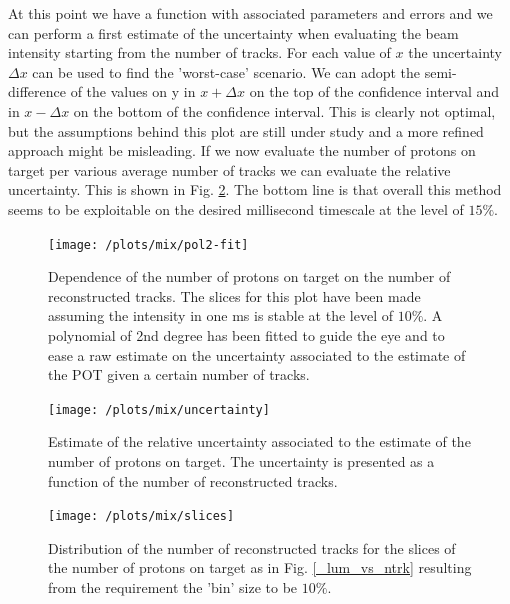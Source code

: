 \documentclass[12pt,a4paper,openright, oneside, titlepage]{book} %
\begin{document}
\noindent At this point we have a function with associated parameters and errors and we can perform a first estimate of the uncertainty when evaluating the beam intensity starting from the number of tracks.
For each value of $x$ the uncertainty $\Delta x$ can be used to find the 'worst-case' scenario.
We can adopt the semi-difference of the values on y in $x+\Delta x$ on the top of the confidence interval and in $x-\Delta x$ on the bottom of the confidence interval.
This is clearly not optimal, 
but the assumptions behind this plot are still under study and a more refined approach might be misleading. 
If we now evaluate the number of protons on target per various average number of tracks we can evaluate the relative uncertainty. 
This is shown in Fig. \ref{_uncertainty}.
The bottom line is that overall this method seems to be exploitable 
on the desired millisecond timescale at the level of $15\%$.\\


\begin{figure}[!htb]
\centering
\texttt{[image: /plots/mix/pol2-fit]}
\caption[Protons on target as a function of the number of tracks]
{Dependence of the number of protons on target on the number of reconstructed tracks. 
The slices for this plot have been made assuming the intensity in one ms is stable at the level of $10\%$. 
A polynomial of 2nd degree has been fitted to guide the eye and to ease a raw estimate on the uncertainty associated to the estimate of the POT given a certain number of tracks.}
\label{_pol2-fit}
\end{figure}

\begin{figure}[!htb]
\centering
\texttt{[image: /plots/mix/uncertainty]}
\caption[Protons on target relative uncertainty]
{Estimate of the relative uncertainty associated to the estimate of the number of protons on target. 
The uncertainty is presented as a function of the number of reconstructed tracks.}
\label{_uncertainty}
\end{figure}


 
\begin{figure}
\centering
\texttt{[image: /plots/mix/slices]}
\caption[Slices in luminosity of the number of tracks]
{Distribution of the number of reconstructed tracks for the slices 
of the number of protons on target as in Fig. \ref{_lum_vs_ntrk} 
resulting from the requirement the 'bin' size to be $10\%$.}
\label{_slices}
\end{figure}
\end{document}
